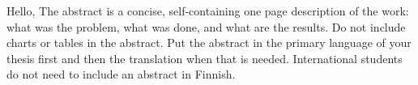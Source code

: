 Hello, The abstract is a concise, self-containing one page description of the work: what was the problem, what was done, and what are the results. Do not include charts or tables in the abstract. Put the abstract in the primary language of your thesis first and then the translation when that is needed. International students do not need to include an abstract in Finnish.